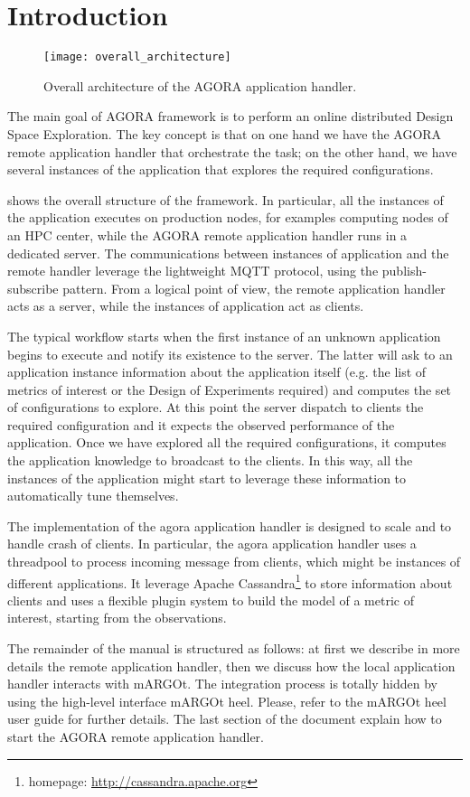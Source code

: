 \section{Introduction}

\begin{figure}
	\centering
	\texttt{[image: overall\_architecture]}
	\caption{Overall architecture of the AGORA application handler.}
	\label{fig:architecture}
\end{figure}


The main goal of AGORA framework is to perform an online distributed Design Space Exploration.
The key concept is that on one hand we have the AGORA remote application handler that orchestrate the task; on the other hand, we have several instances of the application that explores the required configurations.

 shows the overall structure of the framework.
In particular, all the instances of the application executes on production nodes, for examples computing nodes of an HPC center, while the AGORA remote application handler runs in a dedicated server.
The communications between instances of application and the remote handler leverage the lightweight MQTT protocol, using the publish-subscribe pattern.
From a logical point of view, the remote application handler acts as a server, while the instances of application act as clients.

The typical workflow starts when the first instance of an unknown application begins to execute and notify its existence to the server.
The latter will ask to an application instance information about the application itself (e.g. the list of metrics of interest or the Design of Experiments required) and computes the set of configurations to explore.
At this point the server dispatch to clients the required configuration and it expects the observed performance of the application.
Once we have explored all the required configurations, it computes the application knowledge to broadcast to the clients.
In this way, all the instances of the application might start to leverage these information to automatically tune themselves.

The implementation of the agora application handler is designed to scale and to handle crash of clients.
In particular, the agora application handler uses a threadpool to process incoming message from clients, which might be instances of different applications.
It leverage Apache Cassandra\footnote{homepage: \url{http://cassandra.apache.org}} to store information about clients and uses a flexible plugin system to build the model of a metric of interest, starting from the observations.

The remainder of the manual is structured as follows: at first we describe in more details the remote application handler, then we discuss how the local application handler interacts with mARGOt.
The integration process is totally hidden by using the high-level interface mARGOt heel.
Please, refer to the mARGOt heel user guide for further details.
The last section of the document explain how to start the AGORA remote application handler.